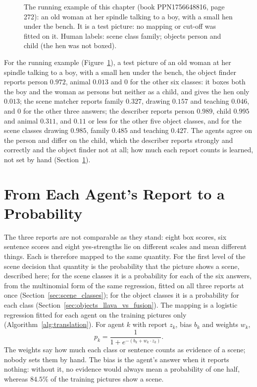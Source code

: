 \begin{figure}[!htbp]
\centering
{}
\caption[The running example]{The running example of this chapter (book PPN1756648816, page 272): an old woman at her spindle talking to a boy, with a small hen under the bench. It is a test picture: no mapping or cut-off was fitted on it. Human labels: scene class family; objects person and child (the hen was not boxed).}
\label{fig:running_example}
\end{figure}

For the running example (Figure~\ref{fig:running_example}), a test picture of an old woman at her spindle talking to a boy, with a small hen under the bench, the object finder reports person $0.972$, animal $0.013$ and $0$ for the other six classes: it boxes both the boy and the woman as persons but neither as a child, and gives the hen only $0.013$; the scene matcher reports family $0.327$, drawing $0.157$ and teaching $0.046$, and $0$ for the other three answers; the describer reports person $0.989$, child $0.995$ and animal $0.311$, and $0.11$ or less for the other five object classes, and for the scene classes drawing $0.985$, family $0.485$ and teaching $0.427$. The agents agree on the person and differ on the child, which the describer reports strongly and correctly and the object finder not at all; how much each report counts is learned, not set by hand (Section~\ref{sec:corrected_translation}).

\section{From Each Agent's Report to a Probability}
\label{sec:corrected_translation}

The three reports are not comparable as they stand: eight box scores, six sentence scores and eight yes-strengths lie on different scales and mean different things. Each is therefore mapped to the same quantity. For the first level of the scene decision that quantity is the probability that the picture shows a scene, described here; for the scene classes it is a probability for each of the six answers, from the multinomial form of the same regression, fitted on all three reports at once (Section~\ref{sec:scene_classes}); for the object classes it is a probability for each class (Section~\ref{sec:objects_llava_vs_fusion}). The mapping is a logistic regression fitted for each agent on the training pictures only (Algorithm~\ref{alg:translation}). For agent $k$ with report $z_k$, bias $b_k$ and weights $w_k$,
\begin{equation}
p_k = \frac{1}{1 + e^{-(b_k + w_k \cdot z_k)}} .
\end{equation}
The weights say how much each class or sentence counts as evidence of a scene; nobody sets them by hand. The bias is the agent's answer when it reports nothing: without it, no evidence would always mean a probability of one half, whereas $84.5\%$ of the training pictures show a scene.

